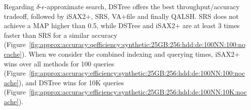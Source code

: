 {{Regarding $\delta$-$\epsilon$-approximate search, DSTree offers the best throughput/accuracy tradeoff, followed by iSAX2+, SRS, {\color{black}VA+file and finally QALSH}. 
SRS does not achieve a MAP higher than 0.5, while DSTree and iSAX2+ are at least 3 times faster than SRS for a similar accuracy (Figure~\ref{fig:approx:accuracy:qefficiency:synthetic:25GB:256:hdd:de:100NN:100:nocache}). 
When we consider the combined indexing and querying times, iSAX2+ wins over all methods for 100 queries (Figure~\ref{fig:approx:accuracy:efficiency:synthetic:25GB:256:hdd:de:100NN:100:nocache}), and DSTree wins for 10K queries (Figure~\ref{fig:approx:accuracy:efficiency:synthetic:25GB:256:hdd:de:100NN:10K:nocache}). 


\begin{figure*}[!htb]
	\captionsetup{justification=centering}
	\captionsetup[subfigure]{justification=centering}
	\begin{subfigure}{\textwidth}
		\centering
		\texttt{[image: \{full\_epsilon\_legend\_25GB]}}\\
	\end{subfigure}	
	\begin{comment}
	\begin{subfigure}{0.16\textwidth}
		\centering
		\texttt{[image: exact\_mapk\_throughput\_sift\_10GB\_128\_ng\_100NN\_100\_nocache]}
		\scriptsize \caption{Sift10GB (ng)} 
		\label{fig:approx:accuracy:qefficiency:sift:10GB:128:hdd:ng:100NN:100:nocache}
	\end{subfigure}
	\begin{subfigure}{0.16\textwidth}
		\centering
		\texttt{[image: exact\_mapk\_throughput\_sift\_10GB\_128\_de\_100NN\_100\_nocache]}
		\scriptsize \caption{Sift10GB ($\bm{\delta\epsilon}$)} 
		\label{fig:approx:accuracy:qefficiency:sift:10GB:128:hdd:de:100NN:100:nocache}
	\end{subfigure}
	\begin{subfigure}{0.16\textwidth}
		\centering
		\texttt{[image: \{exact\_mapk\_idxproc\_sift\_10GB\_128\_ng\_100NN\_100\_nocache]}}
		\scriptsize \caption{Sift10GB (ng)} 
		\label{fig:approx:accuracy:efficiency:sift:10GB:128:hdd:ng:100NN:100:nocache}
	\end{subfigure}
	\begin{subfigure}{0.16\textwidth}
		\centering
		\texttt{[image: exact\_mapk\_idxproc\_sift\_10GB\_128\_de\_100NN\_100\_nocache]}
		\scriptsize \caption{Sift10GB ($\bm{\delta\epsilon}$)} 
		\label{fig:approx:accuracy:efficiency:sift:10GB:128:hdd:de:100NN:100:nocache}

\end{comment}
\end{figure*}}}
